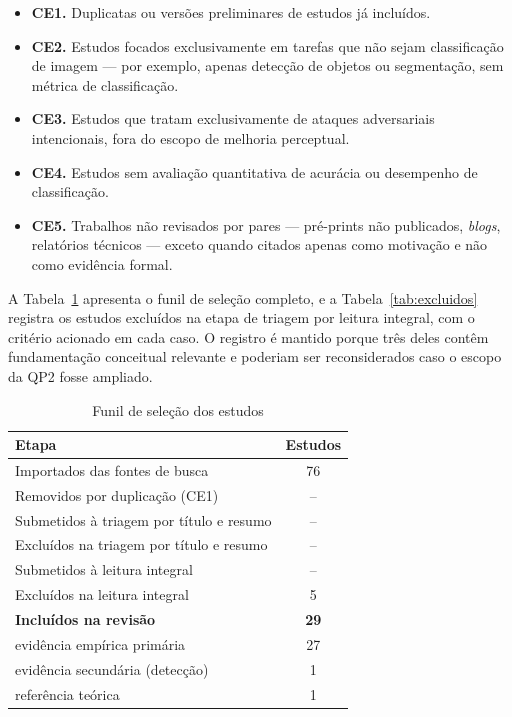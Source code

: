 \documentclass[conference]{IEEEtran}
\begin{document}
\begin{itemize}
\item \textbf{CE1.} Duplicatas ou versões preliminares de estudos já incluídos.
\item \textbf{CE2.} Estudos focados exclusivamente em tarefas que não sejam
classificação de imagem --- por exemplo, apenas detecção de objetos ou
segmentação, sem métrica de classificação.
\item \textbf{CE3.} Estudos que tratam exclusivamente de ataques adversariais
intencionais, fora do escopo de melhoria perceptual.
\item \textbf{CE4.} Estudos sem avaliação quantitativa de acurácia ou
desempenho de classificação.
\item \textbf{CE5.} Trabalhos não revisados por pares --- pré-prints não
publicados, \textit{blogs}, relatórios técnicos --- exceto quando citados
apenas como motivação e não como evidência formal.
\end{itemize}

A Tabela~\ref{tab:funil} apresenta o funil de seleção completo, e a
Tabela~\ref{tab:excluidos} registra os estudos excluídos na etapa de triagem
por leitura integral, com o critério acionado em cada caso. O registro é
mantido porque três deles contêm fundamentação conceitual relevante e poderiam
ser reconsiderados caso o escopo da QP2 fosse ampliado.

\begin{table}[htbp]
\caption{Funil de seleção dos estudos}
\begin{center}
\footnotesize
\begin{tabular}{|p{5.3cm}|c|}
\hline
\textbf{Etapa} & \textbf{Estudos} \\
\hline
Importados das fontes de busca & 76 \\
\hline
Removidos por duplicação (CE1) & -- \\
\hline
Submetidos à triagem por título e resumo & -- \\
\hline
Excluídos na triagem por título e resumo & -- \\
\hline
Submetidos à leitura integral & -- \\
\hline
Excluídos na leitura integral & 5 \\
\hline
\textbf{Incluídos na revisão} & \textbf{29} \\
\hline
\quad evidência empírica primária & 27 \\
\hline
\quad evidência secundária (detecção) & 1 \\
\hline
\quad referência teórica & 1 \\
\hline
\end{tabular}
\label{tab:funil}
\end{center}
\end{table}
\end{document}
